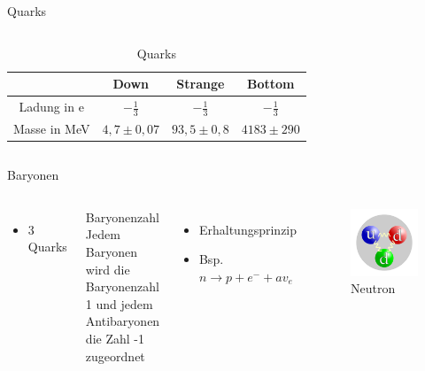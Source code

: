\documentclass[aspectratio=169,xcolor=dvipsnames]{beamer}
\begin{document}
\begin{frame}{Quarks}
\begin{columns}[c]
\begin{table}
\begin{tabular}{c|c|c|c}
                             & \bf Down       & \bf Strange     & \bf Bottom      \\ \hline
                Ladung in e  & $-\frac{1}{3}$ & $-\frac{1}{3}$  & $-\frac{1}{3}$  \\ \hline
                Masse in MeV & $4,7\pm 0,07$  & $93,5\pm0,8$    & $4183\pm 290$   \\
            \end{tabular}
            \caption{Quarks}
            \label{tab:quarks}
        \end{table}
    \end{columns}

\end{frame}
\begin{frame}{Baryonen}
    \begin{columns}[c]
        \begin{itemize}
            \item 3 Quarks
        \end{itemize}
        \begin{block}{Baryonenzahl}
            Jedem Baryonen wird die Baryonenzahl 1 und jedem Antibaryonen die Zahl -1 zugeordnet
        \end{block}
        \begin{itemize}
            \item Erhaltungsprinzip
            \item Bsp. $ n \rightarrow p+e^- +av_e$
        \end{itemize}

        \begin{figure}
            \centering
            \includegraphics[width=0.45\linewidth]{figures/Neutron.png}
            \caption{Neutron}
            \label{fig:neutron}
        \end{figure}
    \end{columns}
\end{frame}
\end{document}
